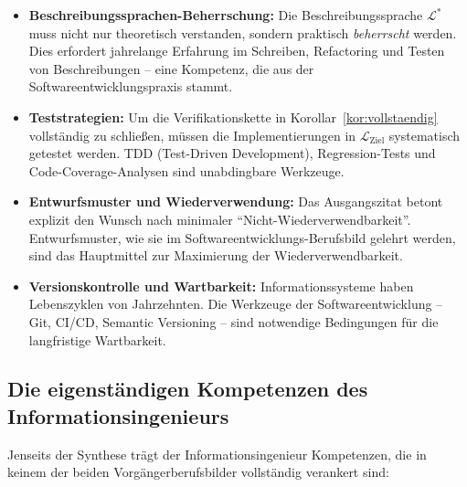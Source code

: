﻿\documentclass[a4paper,12pt]{report}
\theoremstyle{definition}
\begin{document}
\begin{itemize}
  \item \textbf{Beschreibungssprachen-Beherrschung:}
        Die Beschreibungssprache $\mathcal{L}^*$ muss nicht nur theoretisch
        verstanden, sondern praktisch \emph{beherrscht} werden. Dies erfordert
        jahrelange Erfahrung im Schreiben, Refactoring und Testen von Beschreibungen --
        eine Kompetenz, die aus der Softwareentwicklungspraxis stammt.
  \item \textbf{Teststrategien:}
        Um die Verifikationskette in Korollar~\ref{kor:vollstaendig} vollständig
        zu schließen, müssen die Implementierungen in $\mathcal{L}_{\text{Ziel}}$
        systematisch getestet werden. TDD (Test-Driven Development), Regression-Tests
        und Code-Coverage-Analysen sind unabdingbare Werkzeuge.
  \item \textbf{Entwurfsmuster und Wiederverwendung:}
        Das Ausgangszitat betont explizit den Wunsch nach minimaler
        \enquote{Nicht-Wiederverwendbarkeit}. Entwurfsmuster, wie sie im
        Softwareentwicklungs-Berufsbild gelehrt werden, sind das Hauptmittel zur
        Maximierung der Wiederverwendbarkeit.
  \item \textbf{Versionskontrolle und Wartbarkeit:}
        Informationssysteme haben Lebenszyklen von Jahrzehnten. Die Werkzeuge der
        Softwareentwicklung -- Git, CI/CD, Semantic Versioning -- sind notwendige
        Bedingungen für die langfristige Wartbarkeit.
\end{itemize}

\subsection{Die eigenständigen Kompetenzen des Informationsingenieurs}

Jenseits der Synthese trägt der Informationsingenieur Kompetenzen, die in keinem der
beiden Vorgängerberufsbilder vollständig verankert sind:
\end{document}
